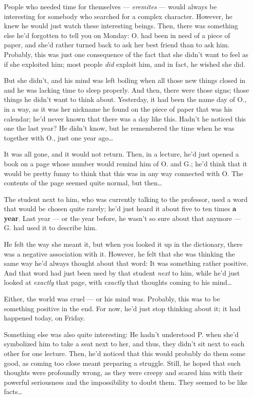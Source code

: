People who needed time for themselves --- \emph{eremites} --- would always be interesting for somebody who searched for a complex character. However, he knew he would just watch these interesting beings. 
Then, there was something else he'd forgotten to tell you on Monday: O. had been in need of a piece of paper, and she'd rather turned back to ask her best friend than to ask him. 
Probably, this was just one consequence of the fact that she didn't want to feel as if she exploited him; most people \emph{did} exploit him, and in fact, he wished she did.

But she didn't, and his mind was left boiling when all those new things closed in and he was lacking time to sleep properly. And then, there were those signs; those things he didn't want to think about. 
Yesterday, it had been the name day of O., in a way, as it was her nickname he found on the piece of paper that was his calendar; he'd never known that there was a day like this. Hadn't he noticed this one the last year? He didn't know, but he remembered the time when he was together with O., just one year ago\ldots

It was all gone, and it would not return. Then, in a lecture, he'd just opened a book on a page whose number would remind him of O. and G.; he'd think that it would be pretty funny to think that this was in any way connected with O. The contents of the page seemed quite normal, but then\ldots

The student next to him, who was currently talking to the professor, used a word that would be chosen quite rarely; he'd just heard it about five to ten times \textbf{a year}. Last year --- or the year before, he wasn't so sure about that anymore --- G. had used it to describe him.

He felt the way she meant it, but when you looked it up in the dictionary, there was a negative association with it. However, he felt that she was thinking the same way he'd always thought about that word: It was something rather positive. And that word had just been used by that student \emph{next} to him, while he'd just looked at \emph{exactly} that page, with \emph{exactly} that thoughts coming to his mind\ldots

Either, the world was cruel --- or his mind was. Probably, this was to be something positive in the end. For now, he'd just stop thinking about it; it had happened today, on Friday.

Something else was also quite interesting: He hadn't understood P. when she'd symbolized him to take a seat next to her, and thus, they didn't sit next to each other for one lecture. Then, he'd noticed that this would probably do them some good, as coming too close meant preparing a struggle. Still, he hoped that such thoughts were profoundly wrong, as they were creepy and scared him with their powerful seriousness and the impossibility to doubt them. They seemed to be like facts\ldots


